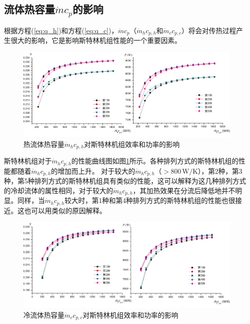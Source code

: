 \subsection{流体热容量$\dot{m}c_p$的影响}

根据方程(\ref{eq:q_h})和方程(\ref{eq:q_c})，$\dot{m}c_p$（$\dot{m}_hc_{p,h}$和$\dot{m}_cc_{p,c}$）将会对传热过程产生很大的影响，它是影响斯特林机组性能的一个重要因素。

\noindent \begin{figure}[htbp]
\begin{center}
	\includegraphics[width = 0.95\columnwidth]{fig/qm_hcp_h}
	\caption{热流体热容量$\dot{m}_hc_{p,h}$对斯特林机组效率和功率的影响}
	\label{fig:qm_hcp_h}
\end{center}
\end{figure}

斯特林机组对于$\dot{m}_hc_{p,h}$的性能曲线图如图\ref{fig:qm_hcp_h}所示。各种排列方式的斯特林机组的性能都随着$\dot{m}_hc_{p,h}$的增加而上升。
对于较大的$\dot{m}_hc_{p,h}$（$> 800\,\mathrm{W/K}$），第2种，第3种，第5种排列方式的斯特林机组具有类似的性能，这可以解释为这几种排列方式的冷却流体的属性相同，对于较大的$\dot{m}_hc_{p,h}$，其加热效果在分流后降低地并不明显。同样，当$\dot{m}_hc_{p,h}$较大时，第1种和第4种排列方式的斯特林机组的性能也很接近。这也可以用类似的原因解释。

\noindent \begin{figure}[htbp]
\begin{center}
	\includegraphics[width = 0.95\columnwidth]{fig/qm_ccp_c}
	\caption{冷流体热容量$\dot{m}_cc_{p,c}$对斯特林机组效率和功率的影响}
	\label{fig:qm_ccp_c}
\end{center}
\end{figure}

